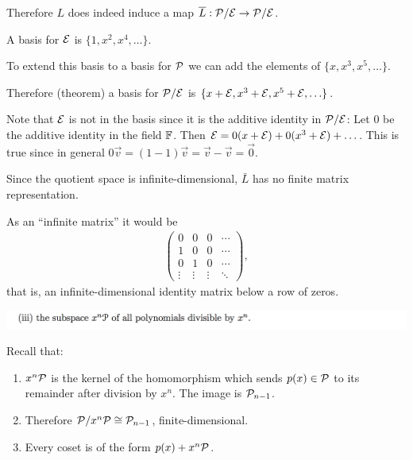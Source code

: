 \documentclass[12pt]{article}
\begin{document}
Therefore $L$ does indeed induce a map $\overline L:\mathcal P/\mathcal E \to \mathcal P/\mathcal E$.

A basis for $\mathcal E$ is $\{1, x^2, x^4, \ldots\}$.

To extend this basis to a basis for $\mathcal P$ we can add the elements of $\{x, x^3, x^5, \ldots\}$.

Therefore (theorem) a basis for $\mathcal P/\mathcal E$ is $\{x + \mathcal E, x^3 + \mathcal E, x^5 + \mathcal E, \ldots\}$.

\begin{mdframed}
  \begin{remark*}
    Note that $\mathcal E$ is not in the basis since it is the additive identity in $\mathcal P/\mathcal E$: Let 0
    be the additive identity in the field $\mathbb{F}$. Then
    $\mathcal E = 0(x + \mathcal E) + 0(x^3 + \mathcal E) + \ldots$. This is true since in general
    $0\vec v = (1 - 1)\vec v = \vec v - \vec v = \vec 0$.
  \end{remark*}
\end{mdframed}

Since the quotient space is infinite-dimensional, $\bar L$ has no finite matrix representation.

As an ``infinite matrix'' it would be
\begin{align*}
  \begin{pmatrix}
    0      & 0      & 0      & \cdots\\
    1      & 0      & 0      & \cdots\\
    0      & 1      & 0      & \cdots\\
    \vdots & \vdots & \vdots & \ddots
  \end{pmatrix},
\end{align*}
that is, an infinite-dimensional identity matrix below a row of zeros.

\begin{mdframed}
\includegraphics[width=400pt]{img/linear-algebra-a0-2-2-3.png}
\end{mdframed}

Recall that:
\begin{enumerate}
\item $x^n\mathcal P$ is the kernel of the homomorphism which sends $p(x) \in \mathcal P$ to its remainder
  after division by $x^n$. The image is $\mathcal P_{n-1}$.
\item Therefore $\mathcal P/x^n\mathcal P \cong \mathcal P_{n-1}$, finite-dimensional.
\item Every coset is of the form $p(x) + x^n\mathcal P$.
\end{enumerate}
\end{document}
